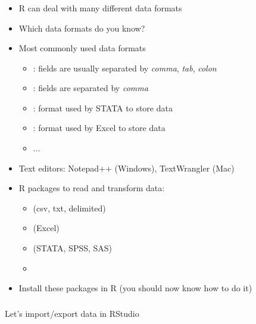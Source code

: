 \documentclass[8pt]{beamer}
\begin{document}
\begin{frame}
\frametitle{\insertsection}

\begin{itemize}[<+->]
\item R can deal with many different data formats
\item Which data formats do you know?
\item Most commonly used data formats
    \begin{itemize}
    \item {\color{blue}{txt}}: fields are usually separated by \textit{comma}, \textit{tab}, \textit{colon}
    \item {\color{blue}{csv}}: fields are separated by \textit{comma}
    \item {\color{blue}{dta}}: format used by STATA to store data
    \item {\color{blue}{xls/xlsx}}: format used by Excel to store data
    \item ...
    \end{itemize}
\item Text editors: Notepad++ (Windows), TextWrangler (Mac)
\item R packages to read and transform data:
    \begin{itemize}
    \item {\color{blue}{``readr''}} (csv, txt, delimited)
    \item {\color{blue}{``readxl''}} (Excel)
    \item {\color{blue}{``haven''}} (STATA, SPSS, SAS)
    \item {\color{blue}{``tidyverse''}}
    \end{itemize}
\item Install these packages in R (you should now know how to do it)
\end{itemize}

\end{frame}


\begin{frame}
\frametitle{\insertsection}

Let's import/export data in RStudio

\end{frame}






\end{document}
